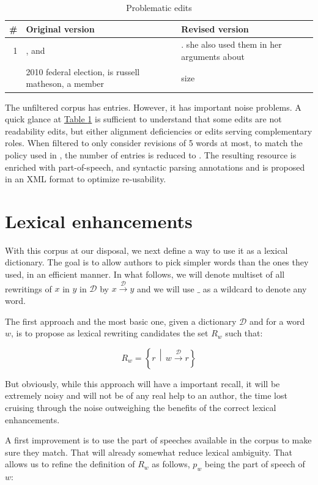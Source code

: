 \documentclass[a4paper, 11pt, onepage]{scrreprt}
\newcommand\tableref[1]{\hyperref[#1]{Table \ref*{#1}}}
\newcommand\maps[1]{\xrightarrow{\mathcal{#1}}}
\newcommand\suchthat{\, \middle| \,}
\begin{document}
\begin{table}[H]
  \centering
  \caption{Problematic edits}
  \begin{tabular}{rp{6cm}p{6cm}}
    \toprule
    \# & Original version & Revised version \\
    \midrule
    1 & , and & . she also used them in her arguments about \\
    \addlinespace
    2 & 2010 federal election, is russell matheson, a member & size\\
  \end{tabular}
  \label{tab:problematic-edits}
\end{table}

The unfiltered corpus has  entries. However, it has
important noise problems. A quick glance at
\tableref{tab:problematic-edits} is sufficient to understand that some
edits are not readability edits, but either alignment deficiencies or
edits serving complementary roles. When filtered to only consider
revisions of 5 words at most, to match the policy used in
\cite{yatskar2010sake}, the number of entries is reduced to
.  The resulting resource is enriched with
part-of-speech, and syntactic parsing annotations and is proposed in
an XML format to optimize re-usability.

\section{Lexical enhancements}
\label{sec:lexical-enhancements}

With this corpus at our disposal, we next define a way to use it as a
lexical dictionary. The goal is to allow authors to pick simpler words
than the ones they used, in an efficient manner. In what follows, we
will denote multiset of all rewritings of $x$ in $y$ in $\mathcal{D}$
by $x \maps{D} y$ and we will use $\_$ as a wildcard to denote any
word.

The first approach and the most basic one, given a dictionary
$\mathcal{D}$ and for a word $w$, is to propose as lexical rewriting
candidates the set $R_w$ such that:

\[
R_w = \left\{r \suchthat w \maps{D} r\right\}
\]

But obviously, while this approach will have a important recall, it
will be extremely noisy and will not be of any real help to an author,
the time lost cruising through the noise outweighing the benefits of
the correct lexical enhancements.

A first improvement is to use the part of speeches available in the
corpus to make sure they match. That will already somewhat reduce
lexical ambiguity. That allows us to refine the definition of $R_w$ as
follows, $p_w$ being the part of speech of $w$:
\end{document}
